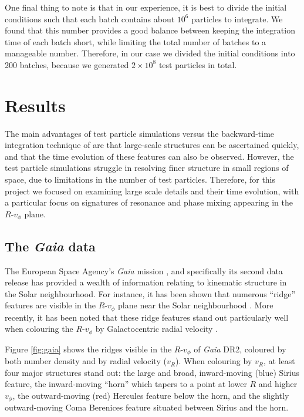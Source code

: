 \documentclass[10pt]{article}
\begin{document}
One final thing to note is that in our experience, it is best to divide the initial conditions such that each batch contains about $10^6$ particles to integrate. We found that this number provides a good balance between keeping the integration time of each batch short, while limiting the total number of batches to a manageable number. Therefore, in our case we divided the initial conditions into 200 batches, because we generated $2 \times 10^8$ test particles in total.

\section{Results} \label{results}
The main advantages of test particle simulations versus the backward-time integration technique of \textcite{D00} are that large-scale structures can be ascertained quickly, and that the time evolution of these features can also be observed. However, the test particle simulations struggle in resolving finer structure in small regions of space, due to limitations in the number of test particles. Therefore, for this project we focused on examining large scale details and their time evolution, with a particular focus on signatures of resonance and phase mixing appearing in the $R$-$v_\phi$ plane.

\subsection{The \textit{Gaia} data}
The European Space Agency's \textit{Gaia} mission \parencite{GaiaMission}, and specifically its second data release \parencite[DR2;][]{DR2} has provided a wealth of information relating to kinematic structure in the Solar neighbourhood. For instance, it has been shown that numerous ``ridge'' features are visible in the $R$-$v_\phi$ plane near the Solar neighbourhood \parencite{KBCCGHS18}. More recently, it has been noted that these ridge features stand out particularly well when colouring the $R$-$v_\phi$ by Galactocentric radial velocity \parencite{Fragkoudi+19}. 

Figure \ref{fig:gaia} shows the ridges visible in the $R$-$v_\phi$ of \textit{Gaia} DR2, coloured by both number density and by radial velocity ($v_R$). When colouring by $v_R$, at least four major structures stand out: the large and broad, inward-moving (blue) Sirius feature, the inward-moving ``horn'' which tapers to a point at lower $R$ and higher $v_\phi$, the outward-moving (red) Hercules feature below the horn, and the slightly outward-moving Coma  Berenices feature situated between Sirius and the horn.
\end{document}

